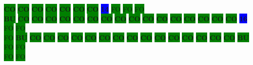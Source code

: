 \colorbox{green}{\color[rgb]{0,0,0}\textbf{CO}}%
\colorbox{green}{\color[rgb]{0,0,0}\textbf{CO}}%
\colorbox{green}{\color[rgb]{0,0,0}\textbf{CO}}%
\colorbox{green}{\color[rgb]{0,0,0}\textbf{CO}}%
\colorbox{green}{\color[rgb]{0,0,0}\textbf{CO}}%
\colorbox{green}{\color[rgb]{0,0,0}\textbf{CO}}%
\colorbox{green}{\color[rgb]{0,0,0}\textbf{CO}}%
\colorbox{blue}{\color[rgb]{1,0,0}\textbf{14}}%
\colorbox{green}{\color[gray]{0.75}FO}%
\colorbox{green}{\color[gray]{0.75}FO}%
\colorbox{green}{\color[gray]{0.75}FO}%
\\
\colorbox{green}{\color[rgb]{1,0,0}\textbf{BU}}%
\colorbox{green}{\color[rgb]{0,0,0}\textbf{CO}}%
\colorbox{green}{\color[rgb]{0,0,0}\textbf{CO}}%
\colorbox{green}{\color[rgb]{0,0,0}\textbf{CO}}%
\colorbox{green}{\color[rgb]{0,0,0}\textbf{CO}}%
\colorbox{green}{\color[rgb]{0,0,0}\textbf{CO}}%
\colorbox{green}{\color[rgb]{0,0,0}\textbf{CO}}%
\colorbox{green}{\color[rgb]{0,0,0}\textbf{CO}}%
\colorbox{green}{\color[rgb]{0,0,0}\textbf{CO}}%
\colorbox{green}{\color[rgb]{0,0,0}\textbf{CO}}%
\colorbox{green}{\color[rgb]{0,0,0}\textbf{CO}}%
\colorbox{green}{\color[rgb]{0,0,0}\textbf{CO}}%
\colorbox{green}{\color[rgb]{0,0,0}\textbf{CO}}%
\colorbox{green}{\color[rgb]{0,0,0}\textbf{CO}}%
\colorbox{green}{\color[rgb]{0,0,0}\textbf{CO}}%
\colorbox{green}{\color[rgb]{0,0,0}\textbf{CO}}%
\colorbox{green}{\color[rgb]{0,0,0}\textbf{CO}}%
\colorbox{blue}{\color[rgb]{1,0,0}\textbf{16}}%
\colorbox{green}{\color[gray]{0.75}FO}%
\colorbox{green}{\color[gray]{0.75}FO}%
\\
\colorbox{green}{\color[gray]{0.75}FO}%
\colorbox{green}{\color[rgb]{1,0,0}\textbf{BU}}%
\colorbox{green}{\color[rgb]{0,0,0}\textbf{CO}}%
\colorbox{green}{\color[rgb]{0,0,0}\textbf{CO}}%
\colorbox{green}{\color[rgb]{0,0,0}\textbf{CO}}%
\colorbox{green}{\color[rgb]{0,0,0}\textbf{CO}}%
\colorbox{green}{\color[rgb]{0,0,0}\textbf{CO}}%
\colorbox{green}{\color[rgb]{0,0,0}\textbf{CO}}%
\colorbox{green}{\color[rgb]{0,0,0}\textbf{CO}}%
\colorbox{green}{\color[rgb]{0,0,0}\textbf{CO}}%
\colorbox{green}{\color[rgb]{0,0,0}\textbf{CO}}%
\colorbox{green}{\color[rgb]{0,0,0}\textbf{CO}}%
\colorbox{green}{\color[rgb]{0,0,0}\textbf{CO}}%
\colorbox{green}{\color[rgb]{0,0,0}\textbf{CO}}%
\colorbox{green}{\color[rgb]{0,0,0}\textbf{CO}}%
\colorbox{green}{\color[rgb]{0,0,0}\textbf{CO}}%
\colorbox{green}{\color[rgb]{0,0,0}\textbf{CO}}%
\colorbox{green}{\color[rgb]{1,0,0}\textbf{BU}}%
\colorbox{green}{\color[gray]{0.75}FO}%
\colorbox{green}{\color[gray]{0.75}FO}%
\\
\colorbox{green}{\color[gray]{0.75}FO}%
\colorbox{green}{\color[gray]{0.75}FO}%
